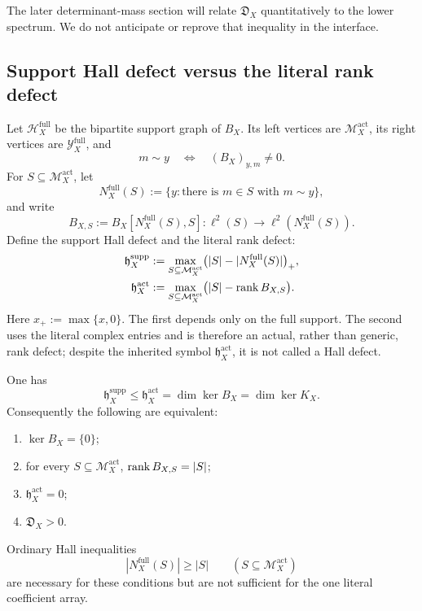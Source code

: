 The later determinant-mass section will relate
\(\mathfrak D_X\) quantitatively to the lower spectrum.  We do not
anticipate or reprove that inequality in the interface.

\subsection{Support Hall defect versus the literal rank defect}

Let \(\mathscr H_X^{\mathrm{full}}\) be the bipartite support graph of
\(B_X\).  Its left vertices are
\(\mathcal M_X^{\mathrm{act}}\), its right vertices are
\(\mathcal Y_X^{\mathrm{full}}\), and
\[
 m\sim y
 \quad\Longleftrightarrow\quad
 (B_X)_{y,m}\ne0.
\]
For \(S\subseteq\mathcal M_X^{\mathrm{act}}\), let
\[
 N_X^{\mathrm{full}}(S)
 :=
 \{y:\text{there is }m\in S\text{ with }m\sim y\},
\]
and write
\[
 B_{X,S}
 :=
 B_X[
 N_X^{\mathrm{full}}(S),S]
 :
 \ell^2(S)\longrightarrow
 \ell^2(N_X^{\mathrm{full}}(S)).
\]
Define the support Hall defect and the literal rank defect:
\begin{align}
 \mathfrak h_X^{\mathrm{supp}}
&:=
 \max_{S\subseteq\mathcal M_X^{\mathrm{act}}}
 \bigl(|S|-|N_X^{\mathrm{full}}(S)|\bigr)_+,
 \label{eq:tpc67-support-Hall-defect}\\
 \mathfrak h_X^{\mathrm{act}}
 &:=
 \max_{S\subseteq\mathcal M_X^{\mathrm{act}}}
 \bigl(|S|-\operatorname{rank} B_{X,S}\bigr).
 \label{eq:tpc67-actual-Hall-defect}
\end{align}
Here \(x_+:=\max\{x,0\}\).  The first depends only on the full support.
The second uses the literal complex entries and is therefore an actual,
rather than generic, rank defect; despite the inherited symbol
\(\mathfrak h_X^{\mathrm{act}}\), it is not called a Hall defect.

\begin{theorem}
\label{thm:tpc67-actual-Hall-kernel}
One has
\begin{equation}
 \boxed{
 \mathfrak h_X^{\mathrm{supp}}
 \le
 \mathfrak h_X^{\mathrm{act}}
 =
 \dim\ker B_X
 =
 \dim\ker K_X.}
 \label{eq:tpc67-Hall-kernel-identity}
\end{equation}
Consequently the following are equivalent:
\begin{enumerate}[label=\textup{(\roman*)},leftmargin=3em]
 \item \(\ker B_X=\{0\}\);
 \item for every \(S\subseteq\mathcal M_X^{\mathrm{act}}\),
       \(\operatorname{rank} B_{X,S}=|S|\);
 \item \(\mathfrak h_X^{\mathrm{act}}=0\);
 \item \(\mathfrak D_X>0\).
\end{enumerate}
Ordinary Hall inequalities
\begin{equation}
 |N_X^{\mathrm{full}}(S)|\ge|S|
 \qquad(S\subseteq\mathcal M_X^{\mathrm{act}})
 \label{eq:tpc67-ordinary-Hall}
\end{equation}
are necessary for these conditions but are not sufficient for the one
literal coefficient array.
\end{theorem}


